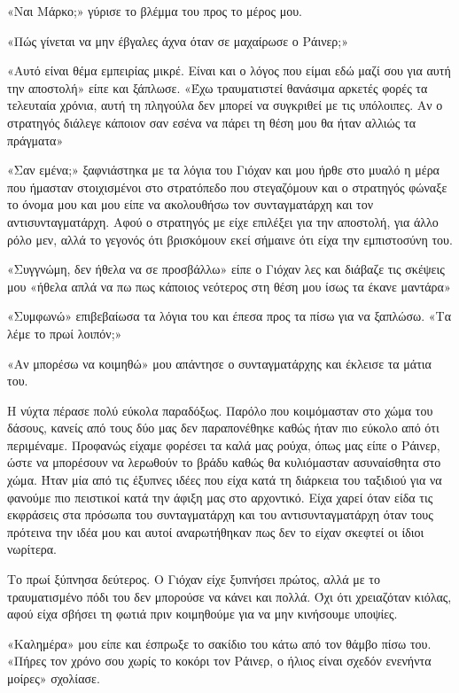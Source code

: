 \documentclass[12pt,twoside, openany]{book}
\begin{document}
«Ναι Μάρκο;» γύρισε το βλέμμα του προς το μέρος μου.

«Πώς γίνεται να μην έβγαλες άχνα όταν σε μαχαίρωσε ο Ράινερ;»

«Αυτό είναι θέμα εμπειρίας μικρέ. Είναι και ο λόγος που είμαι εδώ μαζί σου για αυτή την αποστολή» είπε και ξάπλωσε. «Έχω τραυματιστεί θανάσιμα αρκετές φορές τα τελευταία χρόνια, αυτή τη πληγούλα δεν μπορεί να συγκριθεί με τις υπόλοιπες. Αν ο στρατηγός διάλεγε κάποιον σαν εσένα να πάρει τη θέση μου θα ήταν αλλιώς τα πράγματα»

«Σαν εμένα;» ξαφνιάστηκα με τα λόγια του Γιόχαν και μου ήρθε στο μυαλό η μέρα που ήμασταν στοιχισμένοι στο στρατόπεδο που στεγαζόμουν και ο στρατηγός φώναξε το όνομα μου και μου είπε να ακολουθήσω τον συνταγματάρχη και τον αντισυνταγματάρχη. Αφού ο στρατηγός με είχε επιλέξει για την αποστολή, για άλλο ρόλο μεν, αλλά το γεγονός ότι βρισκόμουν εκεί σήμαινε ότι είχα την εμπιστοσύνη του.

«Συγγνώμη, δεν ήθελα να σε προσβάλλω» είπε ο Γιόχαν λες και διάβαζε τις σκέψεις μου «ήθελα απλά να πω πως κάποιος νεότερος στη θέση μου ίσως τα έκανε μαντάρα»

«Συμφωνώ» επιβεβαίωσα τα λόγια του και έπεσα προς τα πίσω για να ξαπλώσω. «Τα λέμε το πρωί λοιπόν;»

«Αν μπορέσω να κοιμηθώ» μου απάντησε ο συνταγματάρχης και έκλεισε τα μάτια του.

Η νύχτα πέρασε πολύ εύκολα παραδόξως. Παρόλο που κοιμόμασταν στο χώμα του δάσους, κανείς από τους δύο μας δεν παραπονέθηκε καθώς ήταν πιο εύκολο από ότι περιμέναμε. Προφανώς είχαμε φορέσει τα καλά μας ρούχα, όπως μας είπε ο Ράινερ,  ώστε να μπορέσουν να λερωθούν το βράδυ καθώς θα κυλιόμασταν ασυναίσθητα στο χώμα. Ήταν μία από τις έξυπνες ιδέες που είχα κατά τη διάρκεια του ταξιδιού για να φανούμε πιο πειστικοί κατά την άφιξη μας στο αρχοντικό. Είχα χαρεί όταν είδα τις εκφράσεις στα πρόσωπα του συνταγματάρχη και του αντισυνταγματάρχη όταν τους πρότεινα την ιδέα μου και αυτοί αναρωτήθηκαν πως δεν το είχαν σκεφτεί οι ίδιοι νωρίτερα.

Το πρωί ξύπνησα δεύτερος. Ο Γιόχαν είχε ξυπνήσει πρώτος, αλλά με το τραυματισμένο πόδι του δεν μπορούσε να κάνει και πολλά. Όχι ότι χρειαζόταν κιόλας, αφού είχα σβήσει τη φωτιά πριν κοιμηθούμε για να μην κινήσουμε υποψίες.

«Καλημέρα» μου είπε και έσπρωξε το σακίδιο του κάτω από τον θάμβο πίσω του. «Πήρες τον χρόνο σου χωρίς το κοκόρι τον Ράινερ, ο ήλιος είναι σχεδόν ενενήντα μοίρες» σχολίασε.
\end{document}
